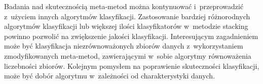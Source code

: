 Badania nad skutecznością meta-metod można kontynuować i~przeprowadzić z~użyciem innych algorytmów klasyfikacji. Zastosowanie bardziej różnorodnych algorytmów klasyfikacji lub większej ilości klasyfikatorów w~metodzie stacking powinno pozwolić na zwiększenie jakości klasyfikacji. Interesującym zagadnieniem może być klasyfikacja niezrównoważonych zbiorów danych z~wykorzystaniem zmodyfikowanych meta-metod, zawierającymi w~sobie algorytmy równoważenia liczebności zbiorów. Kolejnym pomysłem na poprawienie skuteczności klasyfikacji, może być dobór algorytmu w~zależności od charakterystyki danych.
